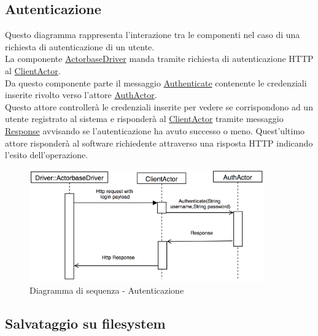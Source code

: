 \documentclass{scalatekids-article}
\begin{document}
\subsection{Autenticazione}

Questo diagramma rappresenta l'interazione tra le componenti nel caso di una richiesta di autenticazione di un utente.\\
La componente \hyperref[sec:actorbase::driver::ActorbaseDriver]{ActorbaseDriver}
manda tramite richiesta di autenticazione HTTP al \hyperref[sec:actorbase::actorsystem::actors::clientactor::ClientActor]{ClientActor}.\\
Da questo componente parte il messaggio \hyperref[sec:actorbase::actorsystem::messages::authactormessages::Authenticate]{Authenticate} contenente le credenziali inserite rivolto verso l'attore \hyperref[sec:actorbase::actorsystem::actors::authactor::AuthActor]{AuthActor}.\\
Questo attore controllerà le credenziali inserite per vedere se corrispondono
ad un utente registrato al sistema e risponderà al \hyperref[sec:actorbase::actorsystem::actors::clientactor::ClientActor]{ClientActor}
tramite messaggio \hyperref[sec:actorbase::actorsystem::messages::clientactormessages::Response]{Response}
avvisando se l'autenticazione ha avuto successo o meno. Quest'ultimo attore
risponderà al software richiedente attraverso una risposta HTTP indicando
l'esito dell'operazione.
\begin{figure}[H]
  \begin{center}
    \includegraphics[width=0.9\textwidth, keepaspectratio]{img/diagrammiSequenza/esempioAuth.png}
    \caption{Diagramma di sequenza - Autenticazione}
  \end{center}
\end{figure}

\subsection{Salvataggio su filesystem}
\end{document}

